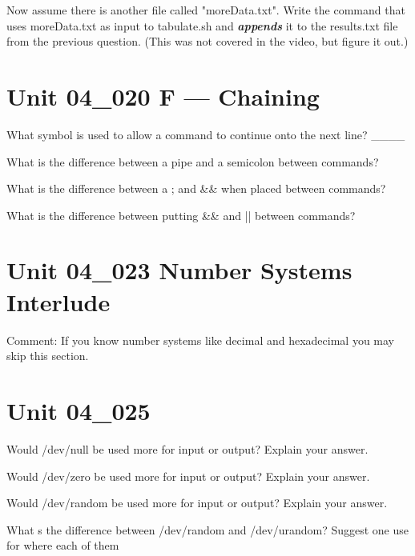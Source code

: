 \documentclass[letterpaper,12pt]{exam}
\newcommand{\unit}{Unit 04}
\begin{document}
\begin {questions}
\begin{samepage}
	\question Now assume there is another file called "moreData.txt".  Write the command that uses moreData.txt as input to tabulate.sh and \textbf{\textit{appends}} it to the results.txt file from the previous question.  (This was not covered in the video, but figure it out.)
	\vspace{5mm}
\end{samepage}

\section*{\unit\_020 F --- Chaining} %

\question What symbol is used to allow a command to continue onto the next line? \_\_\_\_

\question What is the difference between a pipe and a semicolon between commands?
\vspace{5 mm}

\question What is the difference between a ; and \&\& when placed between commands?
\vspace{5mm}

\question What is the difference between putting \&\& and || between commands?
\section*{\unit\_023 Number Systems Interlude} %

Comment:  If you know number systems like decimal and hexadecimal you may skip this section.

\section*{\unit\_025} %

\begin{samepage}
	\question Would /dev/null be used more for input or output?  Explain your answer.
	\vspace{5mm}

	\question Would /dev/zero be used more for input or output?  Explain your answer.
	\vspace{5mm}

	\question Would /dev/random be used more for input or output?  Explain your answer.
	\vspace{5mm}

	\question What s the difference between /dev/random and /dev/urandom?  Suggest one use for where each of them
	\vspace{15mm}


\end{samepage}
\end{questions}
\end{document}
